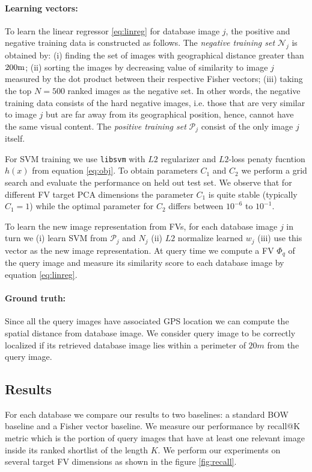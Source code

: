 \documentclass[table]{article} %
\begin{document}
	    \vspace{-4mm}
	    \paragraph{Learning vectors:}
			To learn the linear regressor \eqref{eq:linreg} for database image $j$, the positive and negative training data is constructed as follows. 
			The \emph{negative training set} $\mathcal N_j$ is obtained by: (i) finding the set of images with geographical distance greater than $200{\rm m}$; (ii)  sorting the images by decreasing value of similarity to image $j$ measured by the dot product between their respective Fisher vectors; (iii) taking the top $N=500$ ranked images as the negative set. 
			In other words, the negative training data consists of the hard negative images, i.e. those that are very similar to image $j$ but are far away from its geographical position, hence, cannot have the same visual content. The \emph{positive training set} $\mathcal P_j$ consist of the only image $j$ itself.

			For SVM training we use {\tt libsvm} \cite{libsvm} with $L2$ regularizer and $L2$-loss penaty fucntion $h(x)$ from equation \eqref{eq:obj}. To obtain parameters $C_1$ and $C_2$ we perform a grid search and evaluate the performance on held out test set. We observe that for different FV target PCA dimensions the parameter $C_1$ is quite stable (typically $C_1=1$) while the optimal parameter for $C_2$ differs between $10^{-6}$ to $10^{-1}$.

			To learn the new image representation from FVs, for each database image $j$ in turn we (i) learn SVM from $\mathcal P_j$ and $N_j$ (ii) $L2$ normalize learned $w_j$ (iii) use this vector as the new image representation. At query time we compute a FV $\Phi_q$ of the query image and measure its similarity score to each database image by equation \eqref{eq:linreg}.
		
		\vspace{-4mm}
		\paragraph{Ground truth:}
			Since all the query images have associated GPS location we can compute the spatial distance from database image. We consider query image to be correctly localized if its retrieved database image lies within a perimeter of $20m$ from the query image.
	
	\subsection{Results}
		For each database we compare our results to two baselines: a standard BOW baseline and a Fisher vector baseline. We measure our performance by recall@K metric which is the portion of query images that have at least one relevant image inside its ranked shortlist of the length $K$. We perform our experiments on several target FV dimensions as shown in the figure \ref{fig:recall}.
\end{document}
